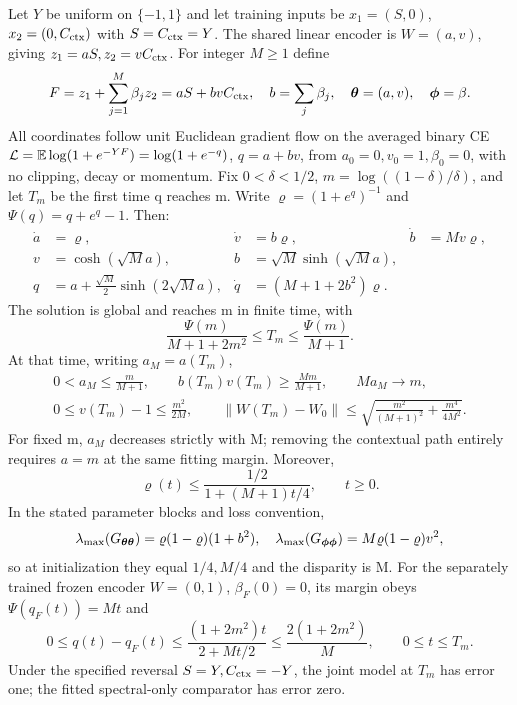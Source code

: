 \begin{theorem}
\label{thm:astra_serial}
Let $Y$ be uniform on $\{-1,1\}$ and let training inputs be
$x_1=(S,0)$, $x_2=(0,C_{\rm ctx})$ with $S=C_{\rm ctx}=Y$.
The shared linear encoder is $W=(a,v)$, giving $z_1=aS,z_2=vC_{\rm ctx}$.
For integer $M\ge1$ define
\[
 F=z_1+\sum_{j=1}^M\beta_jz_2=aS+bvC_{\rm ctx},\quad
 b=\sum_j\beta_j,\quad{\boldsymbol{\theta}}=(a,v),\quad{\boldsymbol{\phi}}=\beta.
\]
All coordinates follow unit Euclidean gradient flow on the averaged
binary CE $\mathcal{L}=\mathbb{E}\log(1+e^{-YF})=\log(1+e^{-q})$, $q=a+bv$,
from $a_0=0,v_0=1,\beta_0=0$, with no clipping, decay or momentum.
Fix $0<\delta<1/2$, $m=\log((1-\delta)/\delta)$, and let $T_m$ be
the first time q reaches m. Write $\varrho=(1+e^q)^{-1}$ and
$\Psi(q)=q+e^q-1$. Then:
\begin{align}
 \dot a&=\varrho,&\dot v&=b\varrho,&\dot b&=Mv\varrho,\label{eq:astra_serial_ode}\\
 v&=\cosh(\sqrt M a),&b&=\sqrt M\sinh(\sqrt M a),\label{eq:astra_serial_phase}\\
 q&=a+\frac{\sqrt M}{2}\sinh(2\sqrt M a),&
 \dot q&=(M+1+2b^2)\varrho.\label{eq:astra_serial_q}
\end{align}
The solution is global and reaches m in finite time, with
\begin{equation}\label{eq:astra_serial_time}
 \frac{\Psi(m)}{M+1+2m^2}\le T_m\le\frac{\Psi(m)}{M+1}.
\end{equation}
At that time, writing $a_M=a(T_m)$,
\begin{gather}
 0<a_M\le\frac{m}{M+1},\qquad b(T_m)v(T_m)\ge\frac{Mm}{M+1},
 \qquad Ma_M\longrightarrow m,\label{eq:astra_serial_update}\\
 0\le v(T_m)-1\le\frac{m^2}{2M},\qquad
 \|W(T_m)-W_0\|\le
 \sqrt{\frac{m^2}{(M+1)^2}+\frac{m^4}{4M^2}}.\label{eq:astra_serial_disp}
\end{gather}
For fixed m, $a_M$ decreases strictly with M; removing the contextual
path entirely requires $a=m$ at the same fitting margin. Moreover,
\begin{equation}\label{eq:astra_serial_envelope}
 \varrho(t)\le\frac{1/2}{1+(M+1)t/4},\qquad t\ge0.
\end{equation}
In the stated parameter blocks and loss convention,
\[
 \lambda_{\max}(G_{{\boldsymbol{\theta}}{\boldsymbol{\theta}}})=\varrho(1-\varrho)(1+b^2),\quad
 \lambda_{\max}(G_{{\boldsymbol{\phi}}{\boldsymbol{\phi}}})=M\varrho(1-\varrho)v^2,
\]
so at initialization they equal $1/4,M/4$ and the disparity is M.
For the separately trained frozen encoder $W=(0,1)$, $\beta_F(0)=0$,
its margin obeys $\Psi(q_F(t))=Mt$ and
\begin{equation}\label{eq:astra_serial_gap}
 0\le q(t)-q_F(t)\le\frac{(1+2m^2)t}{2+Mt/2}
 \le\frac{2(1+2m^2)}M,\qquad0\le t\le T_m.
\end{equation}
Under the specified reversal $S=Y,C_{\rm ctx}=-Y$, the joint model at
$T_m$ has error one; the fitted spectral-only comparator has error zero.
\end{theorem}
